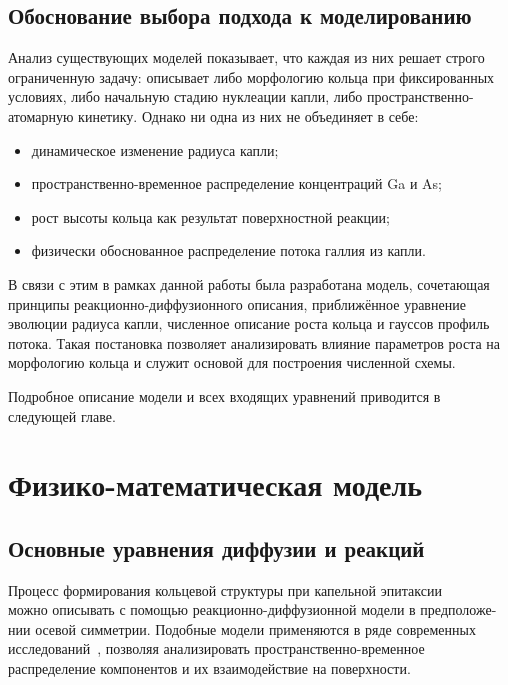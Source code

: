 \documentclass[14pt,oneside]{extarticle}
\begin{document}
\subsection{Обоснование выбора подхода к моделированию}

Анализ существующих моделей показывает, что каждая из них решает строго ограниченную задачу: описывает либо морфологию кольца при фиксированных условиях, либо начальную стадию нуклеации капли, либо пространственно-атомарную кинетику. Однако ни одна из них не объединяет в себе:

\begin{itemize}
  \item динамическое изменение радиуса капли;
  \item пространственно-временное распределение концентраций Ga и As;
  \item рост высоты кольца как результат поверхностной реакции;
  \item физически обоснованное распределение потока галлия из капли.
\end{itemize}

В связи с этим в рамках данной работы была разработана модель, сочетающая принципы реакционно-диффузионного описания, приближённое уравнение эволюции радиуса капли, численное описание роста кольца и гауссов профиль потока. Такая постановка позволяет анализировать влияние параметров роста на морфологию кольца и служит основой для построения численной схемы.

Подробное описание модели и всех входящих уравнений приводится в следующей главе.


\pagebreak

\section{Физико-математическая модель}

\subsection{Основные уравнения диффузии и реакций}

Процесс формирования кольцевой структуры при капельной эпитаксии\\
можно описывать с помощью реакционно-диффузионной модели в предположе- \\
нии осевой симметрии. Подобные модели применяются в ряде современных исследований~\cite{reyes2013, bietti2020}, позволяя анализировать пространственно-временное распределение компонентов и их взаимодействие на поверхности.
\end{document}
